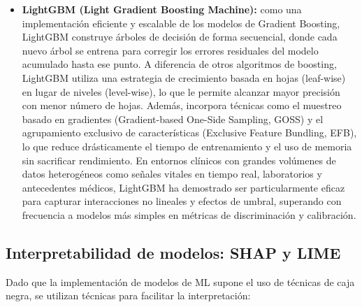 \begin{itemize}
    \item \textbf{LightGBM (Light Gradient Boosting Machine):} como una implementación eficiente y escalable de los modelos de Gradient Boosting, LightGBM construye árboles de decisión de forma secuencial, donde cada nuevo árbol se entrena para corregir los errores residuales del modelo acumulado hasta ese punto. A diferencia de otros algoritmos de boosting, LightGBM utiliza una estrategia de crecimiento basada en hojas (leaf-wise) en lugar de niveles (level-wise), lo que le permite alcanzar mayor precisión con menor número de hojas. Además, incorpora técnicas como el muestreo basado en gradientes (Gradient-based One-Side Sampling, GOSS) y el agrupamiento exclusivo de características (Exclusive Feature Bundling, EFB), lo que reduce drásticamente el tiempo de entrenamiento y el uso de memoria sin sacrificar rendimiento. En entornos clínicos con grandes volúmenes de datos heterogéneos como señales vitales en tiempo real, laboratorios y antecedentes médicos, LightGBM ha demostrado ser particularmente eficaz para capturar interacciones no lineales y efectos de umbral, superando con frecuencia a modelos más simples en métricas de discriminación y calibración.
\end{itemize}

\subsection{Interpretabilidad de modelos: SHAP y LIME}

Dado que la implementación de modelos de ML supone el uso de técnicas de caja negra, se utilizan técnicas para facilitar la interpretación:

